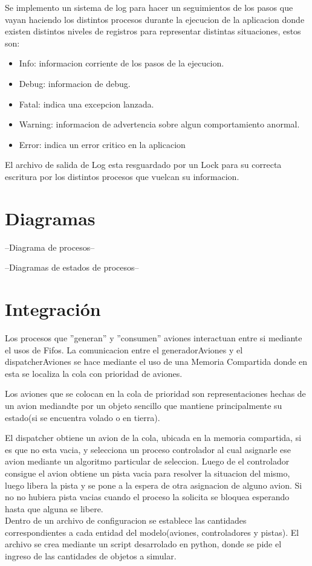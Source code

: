 \documentclass[a4paper,12pt,titlepage]{article}
\begin{document}
Se implemento un sistema de log para hacer un seguimientos de los pasos que vayan haciendo los distintos procesos durante la ejecucion de la aplicacion donde existen distintos niveles de registros para representar distintas situaciones, estos son:
\begin{itemize}
\item Info: informacion corriente de los pasos de la ejecucion.
\item Debug: informacion de debug.
\item Fatal: indica una excepcion lanzada.
\item Warning: informacion de advertencia sobre algun comportamiento anormal.
\item Error: indica un error critico en la aplicacion
\end{itemize}
El archivo de salida de Log esta resguardado por un Lock para su correcta escritura por los distintos procesos que vuelcan su informacion.

\newpage
\section{Diagramas}

--Diagrama de procesos--

--Diagramas de estados de procesos--


\newpage
\section{Integración}


Los procesos que ''generan'' y ''consumen'' aviones interactuan entre si mediante el usos de Fifos. La comunicacion entre el generadorAviones y el dispatcherAviones se hace mediante el uso de una Memoria Compartida donde en esta se localiza la cola con prioridad de aviones. 

Los aviones que se colocan en la cola de prioridad son representaciones hechas de un avion mediandte por un objeto sencillo que mantiene principalmente su estado(si se encuentra volado o en tierra).

El dispatcher obtiene un avion de la cola, ubicada en la memoria compartida, si es que no esta vacia, y selecciona un proceso controlador al cual asignarle ese avion mediante un algoritmo particular de seleccion.
Luego de el controlador consigue el avion obtiene un pista vacia para resolver la situacion del mismo, luego libera la pista y se pone a la espera de otra asignacion de alguno avion. Si no no hubiera pista vacias cuando el proceso la solicita se bloquea esperando hasta que alguna se libere.\\


Dentro de un archivo de configuracion se establece las cantidades correspondientes a cada entidad del modelo(aviones, controladores y pistas). El archivo se crea mediante un script desarrolado en python, donde se pide el ingreso de las cantidades de objetos a simular.
\end{document}
